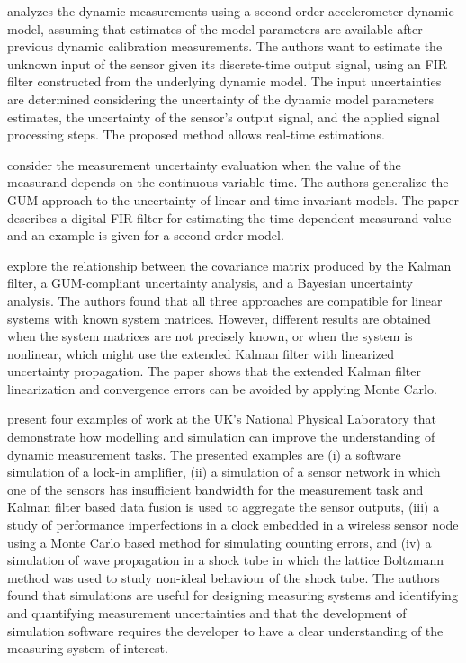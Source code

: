 \documentclass[11pt]{article}
\begin{document}
\citet{Elster07} analyzes the dynamic measurements using a second-order accelerometer dynamic model, assuming that estimates of the model parameters are available after previous dynamic calibration measurements. The authors want to estimate the unknown input of the sensor given its discrete-time output signal, using an FIR filter constructed from the underlying dynamic model. The input  uncertainties are determined considering the uncertainty of the dynamic model parameters estimates, the uncertainty of the sensor's output signal, and the applied signal processing steps. The proposed method allows real-time estimations.

\citet{Elster08} consider the measurement uncertainty evaluation when the value of the measurand depends on the continuous variable time. The authors generalize the GUM approach to the uncertainty of linear and time-invariant models. The paper describes a digital FIR filter for estimating the time-dependent  measurand value and an example is given for a second-order model.

\citet{Eichstadt16b} explore the relationship between the covariance matrix produced by the Kalman filter, a GUM-compliant uncertainty analysis, and a Bayesian uncertainty analysis. The authors found that all three approaches are compatible for linear systems with known system matrices. However, different results are obtained when the system matrices are not precisely known, or when the system is nonlinear, which might use the extended Kalman filter with linearized uncertainty propagation. The paper shows that the extended Kalman filter linearization and convergence errors can be avoided by applying Monte Carlo.

\citet{Esward16} present four examples of work at the UK's National Physical Laboratory that demonstrate how modelling and simulation can improve the understanding of dynamic measurement tasks. The presented examples are (i) a software simulation of a lock-in amplifier, (ii) a simulation of a sensor network in which one of the sensors has insufficient bandwidth for the measurement task and Kalman filter based data fusion is used to aggregate the sensor outputs, (iii) a study of performance imperfections in a clock embedded in a wireless sensor node using a Monte Carlo based method for simulating counting errors, and (iv) a simulation of wave propagation in a shock tube in which the lattice Boltzmann method was used to study non-ideal behaviour of the shock tube. The authors found that simulations are useful for designing measuring systems and identifying and quantifying measurement uncertainties and that the development of simulation software requires the developer to have a clear understanding of the measuring system of interest.
\end{document}
